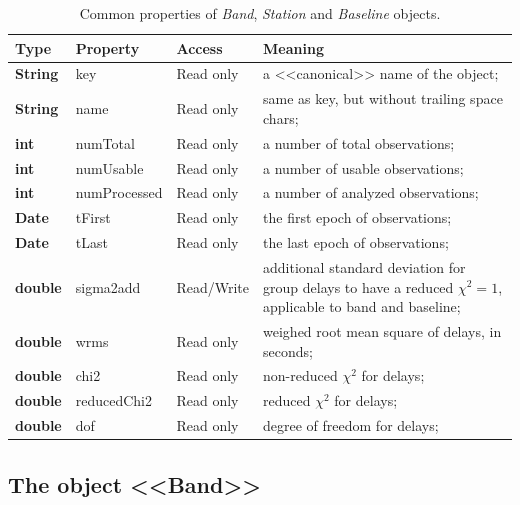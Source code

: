 \documentclass [10pt,letterpaper]{report}
\begin{document}
\begin{table}[htb]
\centering
\footnotesize
\begin{tabular}{lllp{}}
\hline
Type & Property & Access & Meaning\\
\hline
  {\bf String}  & key           & Read only & a <<canonical>> name of the object;\\
  {\bf String}  & name          & Read only & same as key, but without trailing space chars;\\

  {\bf int}     & numTotal      & Read only & a number of total observations;\\
  {\bf int}     & numUsable     & Read only & a number of usable observations;\\
  {\bf int}     & numProcessed  & Read only & a number of analyzed observations;\\

  {\bf Date}    & tFirst        & Read only & the first epoch of observations;\\
  {\bf Date}    & tLast         & Read only & the last epoch of observations;\\

  {\bf double}  & sigma2add     & Read/Write& additional standard deviation for group delays to have a reduced $\chi^2=1$, applicable to band and baseline;\\

  {\bf double}  & wrms          & Read only & weighed root mean square of delays, in seconds;\\
  {\bf double}  & chi2          & Read only & non-reduced $\chi^2$ for delays;\\
  {\bf double}  & reducedChi2   & Read only & reduced $\chi^2$ for delays;\\
  {\bf double}  & dof           & Read only & degree of freedom for delays;\\
\hline
\end{tabular}
\caption{Common properties of {\sl Band}, {\sl Station} and {\sl Baseline} objects.}
\label{tab-scr-session-obj}
\end{table}



\subsection{The object <<Band>>}
\label{section-scripting-session-band}
\end{document}

